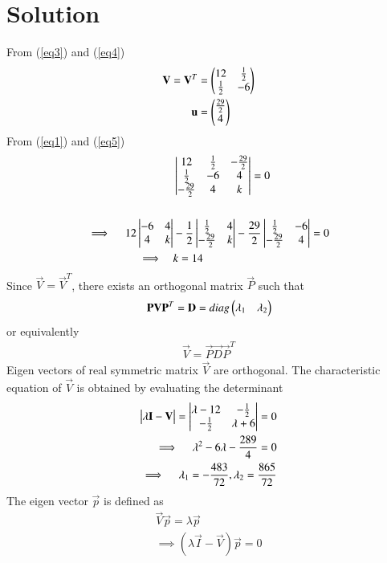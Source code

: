 \documentclass[journal,12pt,twocolumn]{IEEEtran}
\begin{document}
\section{Solution}
From (\ref{eq3}) and (\ref{eq4})
\begin{align}
	\mathbf{V}=\mathbf{V}^T &= \begin{pmatrix}12 & \frac{1}{2} \\ \frac{1}{2} & -6\end{pmatrix} \\
	\mathbf{u} &= \begin{pmatrix}\frac{29}{2} \\ 4\end{pmatrix}
\end{align}
From (\ref{eq1}) and (\ref{eq5})
\begin{align}
	& \begin{vmatrix}12 & \frac{1}{2} & -\frac{29}{2} \\ 
	       \frac{1}{2} & -6 & 4     \\
	       -\frac{29}{2} & 4 & k \end{vmatrix} = 0 \\  \nonumber \\
	 \implies \quad 12\begin{vmatrix}-6 & 4 \\ 4 & k\end{vmatrix} &-\frac{1}{2}\begin{vmatrix}\frac{1}{2} & 4 \\ 
	 				-\frac{29}{2} & k\end{vmatrix}
	-\frac{29}{2}\begin{vmatrix}\frac{1}{2} & -6 \\ -\frac{29}{2} & 4\end{vmatrix} = 0 \\
	 \implies \quad & k =14
\end{align}
Since $ \vec{V} = \vec{V}^T $, there exists an orthogonal matrix $\vec{P}$ such that
\begin{align}
	\mathbf{P}\mathbf{V}\mathbf{P}^T = \mathbf{D} = diag\begin{pmatrix}\lambda_1 & \lambda_2\end{pmatrix}
\end{align}
or equivalently 
\begin{align}
	\vec{V} = \vec{P}\vec{D}\vec{P}^T
\end{align}
Eigen vectors of real symmetric matrix $\vec{V}$ are orthogonal. The characteristic equation of $\vec{V}$ is obtained by evaluating the determinant
\begin{align}
	\begin{vmatrix}\lambda\mathbf{I}-\mathbf{V}\end{vmatrix} = \begin{vmatrix}\lambda-12 & -\frac{1}{2} \\ -\frac{1}{2} & \lambda +6\end{vmatrix} = 0 \\
	\implies \quad \lambda^2-6\lambda-\frac{289}{4}=0 \\
	\implies \quad \lambda_1=-\frac{483}{72},\lambda_2=\frac{865}{72}
\end{align}
The eigen vector $\vec{p}$ is defined as
\begin{align}
	\vec{V}\vec{p}=\lambda\vec{p} \\
	\implies (\lambda\vec{I} - \vec{V})\vec{p}=0
\end{align}
\end{document}

